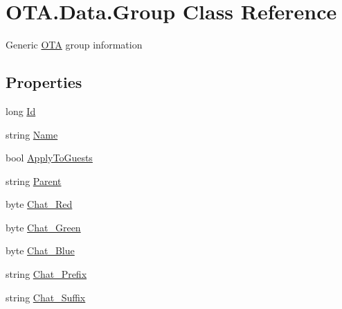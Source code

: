 \hypertarget{class_o_t_a_1_1_data_1_1_group}{}\section{O\+T\+A.\+Data.\+Group Class Reference}
\label{class_o_t_a_1_1_data_1_1_group}


Generic \hyperlink{namespace_o_t_a}{O\+T\+A} group information  


\subsection*{Properties}
\begin{DoxyCompactItemize}
\item 
long \hyperlink{class_o_t_a_1_1_data_1_1_group_abd7c0dc28fe93e521af197a38155495d}{Id}
\item 
string \hyperlink{class_o_t_a_1_1_data_1_1_group_af014f919d424622fe09aa7246e59990e}{Name}
\item 
bool \hyperlink{class_o_t_a_1_1_data_1_1_group_ae567785a38482d84babffad8b9d890ad}{Apply\+To\+Guests}
\item 
string \hyperlink{class_o_t_a_1_1_data_1_1_group_abb44e1c5f261b87431a22599e2fb7595}{Parent}
\item 
byte \hyperlink{class_o_t_a_1_1_data_1_1_group_adb2042fe15404e0339ac7e931ba1c5cc}{Chat\+\_\+\+Red}
\item 
byte \hyperlink{class_o_t_a_1_1_data_1_1_group_af56ebaae71d547c37319bcee4710da2c}{Chat\+\_\+\+Green}
\item 
byte \hyperlink{class_o_t_a_1_1_data_1_1_group_a8004d9e36b4921eb366b25c058ef8ca2}{Chat\+\_\+\+Blue}
\item 
string \hyperlink{class_o_t_a_1_1_data_1_1_group_af5c964c7da526f86e01105d0102ada21}{Chat\+\_\+\+Prefix}
\item 
string \hyperlink{class_o_t_a_1_1_data_1_1_group_a35f297dee168a87295f81df367f0e331}{Chat\+\_\+\+Suffix}
\end{DoxyCompactItemize}


